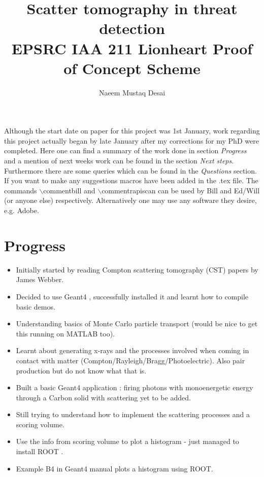 \documentclass[12pt,twoside]{article}
\title{Scatter tomography in threat detection \\ \vspace{0.1in} \small{EPSRC IAA 211 Lionheart Proof of Concept Scheme}}
\author{Naeem Mustaq Desai}
\newcommand{\commentbill}[1]{ {\color{red} #1}}%
\newcommand{\commentbill}[1]{}
\newcommand{\commentrapiscan}[1]{ {\color{blue} #1}}%
\newcommand{\commentrapiscan}[1]{}
\begin{document}
\maketitle

Although the start date on paper for this project was 1st January, work regarding this project actually began by late January after my corrections for my PhD were completed. 
Here one can find a summary of the work done in section \textit{Progress} and a mention of next weeks work can be found in the section \textit{Next steps}. Furthermore there are some queries which can be found in
the \textit{Questions} section. If you want to make any suggestions macros have been added in the .tex file. The commands $\backslash$commentbill and $\backslash$commentrapiscan can be used by 
\commentbill{Bill} and \commentrapiscan{Ed/Will (or anyone else)} respectively. Alternatively one may use any software they desire, e.g. Adobe.  

\section*{Progress}

\begin{itemize}
 \item Initially started by reading Compton scattering tomography (CST) papers \cite{James2D,James3D} by James Webber.
 \item Decided to use Geant4 \cite{Geant4Bib}, successfully installed it and learnt how to compile basic demos.
 \item Understanding basics of Monte Carlo particle transport (would be nice to get this running on MATLAB too).
 \item Learnt about generating x-rays and the processes involved when coming in contact with matter (Compton/Rayleigh/Bragg/Photoelectric). Also pair production but do not know what that is.
 \item Built a basic Geant4 application : firing photons with monoenergetic energy through a Carbon solid with scattering yet to be added.
 \item Still trying to understand how to implement the scattering processes and a scoring volume. 
 \item Use the info from scoring volume to plot a histogram - just managed to install ROOT \cite{Root}.
 \item Example B4 in Geant4 manual plots a histogram using ROOT.
\end{itemize}
\end{document}

